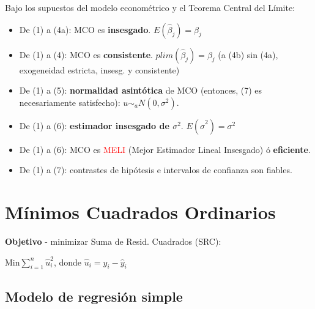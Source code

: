\documentclass[10pt, a4paper, landscape]{extarticle}
\begin{document}
\begin{multicols}{3}
Bajo los supuestos del modelo econométrico y el Teorema Central del Límite:
\begin{itemize}[leftmargin=*]
\item De (1) a (4a): MCO es \textbf{insesgado}. $E(\hat{\beta}_j) = \beta_j$
\item De (1) a (4): MCO es \textbf{consistente}. $plim(\hat{\beta}_j) = \beta_j$ (a (4b) sin (4a), exogeneidad estricta, insesg. y consistente)
\item De (1) a (5): \textbf{normalidad asintótica} de MCO (entonces, (7) es necesariamente satisfecho): $u \sim_a N(0,\sigma^2)$.
\item De (1) a (6): \textbf{estimador insesgado de $\sigma^2$}. $E(\hat{\sigma}^2) = \sigma^2$
\item De (1) a (6): MCO es \textcolor{red}{MELI} (Mejor Estimador Lineal Insesgado) ó \textbf{eficiente}. 
\item De (1) a (7): contrastes de hipótesis e intervalos de confianza son fiables.
\end{itemize}

\section*{Mínimos Cuadrados Ordinarios}

\textbf{Objetivo} - minimizar Suma de Resid. Cuadrados (SRC):

\begin{center}
$\text{Min} \sum_{i=1}^n \hat{u}_i^2$, donde $\hat{u}_i = y_i - \hat{y}_i$
\end{center}

\subsection*{Modelo de regresión simple}

\setlength{\multicolsep}{0pt} %
\setlength{\columnsep}{-40pt} %
\begin{multicols}{2} %



\end{multicols}
\end{multicols}
\end{document}
